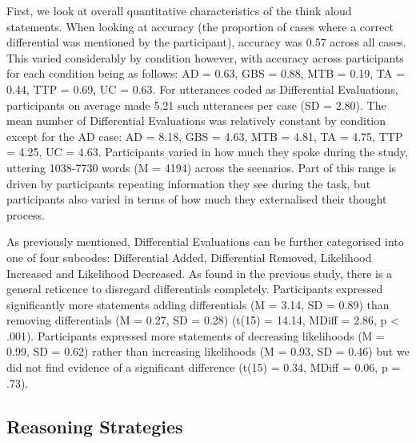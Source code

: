 \documentclass[a4paper, nobind]{templates/ociamthesis}
\begin{document}
First, we look at overall quantitative characteristics of the think aloud statements. When looking at accuracy (the proportion of cases where a correct differential was mentioned by the participant), accuracy was 0.57 across all cases. This varied considerably by condition however, with accuracy across participants for each condition being as follows: AD = 0.63, GBS = 0.88, MTB = 0.19, TA = 0.44, TTP = 0.69, UC = 0.63. For utterances coded as Differential Evaluations, participants on average made 5.21 such utterances per case (SD = 2.80). The mean number of Differential Evaluations was relatively constant by condition except for the AD case: AD = 8.18, GBS = 4.63, MTB = 4.81, TA = 4.75, TTP = 4.25, UC = 4.63. Participants varied in how much they spoke during the study, uttering 1038-7730 words (M = 4194) across the scenarios. Part of this range is driven by participants repeating information they see during the task, but participants also varied in terms of how much they externalised their thought process.

As previously mentioned, Differential Evaluations can be further categorised into one of four subcodes: Differential Added, Differential Removed, Likelihood Increased and Likelihood Decreased. As found in the previous study, there is a general reticence to disregard differentials completely. Participants expressed significantly more statements adding differentials (M = 3.14, SD = 0.89) than removing differentials (M = 0.27, SD = 0.28) (t(15) = 14.14, MDiff = 2.86, p \textless{} .001). Participants expressed more statements of decreasing likelihoods (M = 0.99, SD = 0.62) rather than increasing likelihoods (M = 0.93, SD = 0.46) but we did not find evidence of a significant difference (t(15) = 0.34, MDiff = 0.06, p = .73).

\subsection*{Reasoning Strategies}\label{reasoning-strategies}
\end{document}
